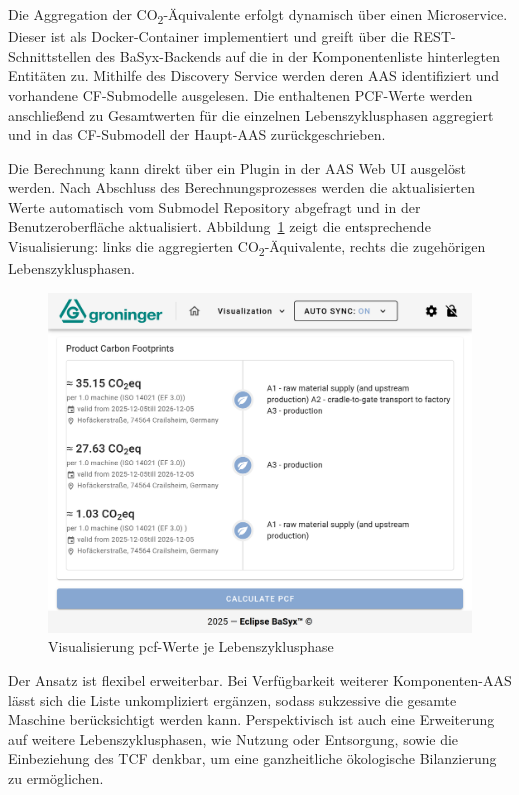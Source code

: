 Die Aggregation der CO\textsubscript{2}-Äquivalente erfolgt dynamisch über einen Microservice. 
Dieser ist als Docker-Container implementiert und greift über die REST-Schnittstellen des BaSyx-Backends auf die in der Komponentenliste hinterlegten Entitäten zu. 
Mithilfe des Discovery Service werden deren AAS identifiziert und vorhandene CF-Submodelle ausgelesen. 
Die enthaltenen PCF-Werte werden anschließend zu Gesamtwerten für die einzelnen Lebenszyklusphasen aggregiert und in das CF-Submodell der Haupt-AAS zurückgeschrieben.

Die Berechnung kann direkt über ein Plugin in der AAS Web UI ausgelöst werden.
Nach Abschluss des Berechnungsprozesses werden die aktualisierten Werte automatisch vom Submodel Repository abgefragt und in der Benutzeroberfläche aktualisiert.
Abbildung~\ref{fig:PluginAggregation} zeigt die entsprechende Visualisierung: links die aggregierten CO\textsubscript{2}-Äquivalente, rechts die zugehörigen Lebenszyklusphasen.

\begin{figure}[htbp]
    \centering
        \includegraphics[width=1\textwidth]{Bilder/ErgebnisseAASWebUI/CarbonFootprint.png}
    \caption{Visualisierung \acs{pcf}-Werte je Lebenszyklusphase}
    \label{fig:PluginAggregation}
\end{figure}
\vspace{-0.5em}

Der Ansatz ist flexibel erweiterbar.
Bei Verfügbarkeit weiterer Komponenten-AAS lässt sich die Liste unkompliziert ergänzen, sodass sukzessive die gesamte Maschine berücksichtigt werden kann. 
Perspektivisch ist auch eine Erweiterung auf weitere Lebenszyklusphasen, wie Nutzung oder Entsorgung, sowie die Einbeziehung des TCF denkbar, um eine ganzheitliche ökologische Bilanzierung zu ermöglichen.

